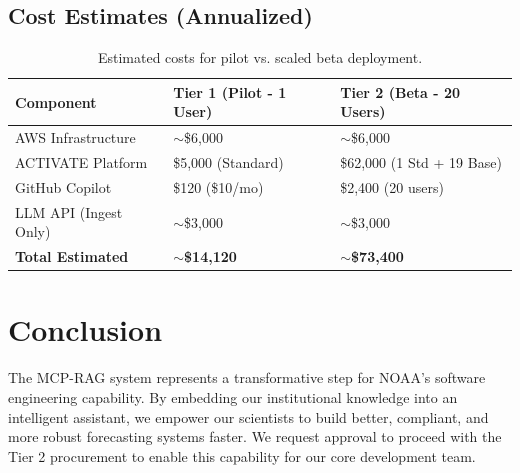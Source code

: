 \documentclass[10pt]{article}
\begin{document}
\subsection*{Cost Estimates (Annualized)}
\begin{table}[h]
\centering
\begin{tabular}{@{}lll@{}}
\toprule
\textbf{Component} & \textbf{Tier 1 (Pilot - 1 User)} & \textbf{Tier 2 (Beta - 20 Users)} \\ \midrule
AWS Infrastructure & $\sim$\$6,000 & $\sim$\$6,000 \\
ACTIVATE Platform & \$5,000 (Standard) & \$62,000 (1 Std + 19 Base) \\
GitHub Copilot & \$120 (\$10/mo) & \$2,400 (20 users) \\
LLM API (Ingest Only) & $\sim$\$3,000 & $\sim$\$3,000 \\ \midrule
\textbf{Total Estimated} & \textbf{$\sim$\$14,120} & \textbf{$\sim$\$73,400} \\ \bottomrule
\end{tabular}
\caption{Estimated costs for pilot vs. scaled beta deployment.}
\end{table}

\section*{Conclusion}
The MCP-RAG system represents a transformative step for NOAA's software engineering capability. By embedding our institutional knowledge into an intelligent assistant, we empower our scientists to build better, compliant, and more robust forecasting systems faster. We request approval to proceed with the Tier 2 procurement to enable this capability for our core development team.
\end{document}
